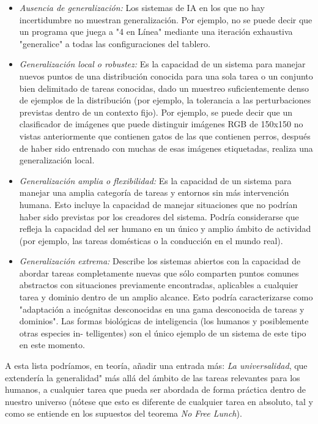 \begin{itemize}
\item \textit{Ausencia de generalización:} Los sistemas de IA en los que no hay incertidumbre no muestran generalización. Por ejemplo, no se puede decir que un programa que juega a "4 en Línea" mediante una iteración exhaustiva "generalice" a todas las configuraciones del tablero.

\item \textit{Generalización local o robustez:} Es la capacidad de un sistema para manejar nuevos puntos de una distribución conocida para una sola tarea o un conjunto bien delimitado de tareas conocidas, dado un muestreo suficientemente denso de ejemplos de la distribución (por ejemplo, la tolerancia a las perturbaciones previstas dentro de un contexto fijo). Por ejemplo, se puede decir que un clasificador de imágenes que puede distinguir imágenes RGB de 150x150 no vistas anteriormente que contienen gatos de las que contienen perros, después de haber sido entrenado con muchas de esas imágenes etiquetadas, realiza una generalización local. 

\item \textit{Generalización amplia o flexibilidad:} Es la capacidad de un sistema para manejar una amplia categoría de tareas y entornos sin más intervención humana. Esto incluye la capacidad de manejar situaciones que no podrían haber sido previstas por los creadores del sistema. Podría considerarse que refleja la capacidad del ser humano en un único y amplio ámbito de actividad (por ejemplo, las tareas domésticas o la conducción en el mundo real).

\item \textit{Generalización extrema:} Describe los sistemas abiertos con la capacidad de abordar tareas completamente nuevas que sólo comparten puntos comunes abstractos con situaciones previamente encontradas, aplicables a cualquier tarea y dominio dentro de un amplio alcance. Esto podría caracterizarse como "adaptación a incógnitas desconocidas en una gama desconocida de tareas y dominios". Las formas biológicas de inteligencia (los humanos y posiblemente otras especies in- telligentes) son el único ejemplo de un sistema de este tipo en este momento.
\end{itemize}

A esta lista podríamos, en teoría, añadir una entrada más: \textit{La universalidad}, que extendería la generalidad" más allá del ámbito de las tareas relevantes para los humanos, a cualquier tarea que pueda ser abordada de forma práctica dentro de nuestro universo (nótese que esto es diferente de cualquier tarea en absoluto, tal y como se entiende en los supuestos del teorema \textit{No Free Lunch}).

